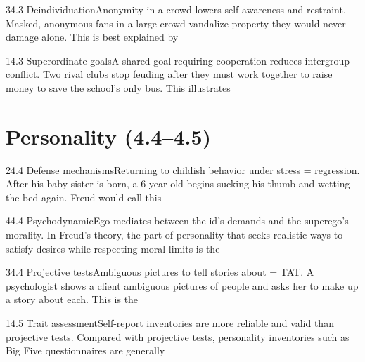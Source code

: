 \documentclass[11pt]{article}
\begin{document}
\begin{q}{3}{4.3 Deindividuation}{Anonymity in a crowd lowers self-awareness and restraint.}
Masked, anonymous fans in a large crowd vandalize property they would never damage alone. This is best explained by
\end{q}

\begin{q}{1}{4.3 Superordinate goals}{A shared goal requiring cooperation reduces intergroup conflict.}
Two rival clubs stop feuding after they must work together to raise money to save the school's only bus. This illustrates
\end{q}

\section{Personality (4.4--4.5)}

\begin{q}{2}{4.4 Defense mechanisms}{Returning to childish behavior under stress = regression.}
After his baby sister is born, a 6-year-old begins sucking his thumb and wetting the bed again. Freud would call this
\end{q}

\begin{q}{4}{4.4 Psychodynamic}{Ego mediates between the id's demands and the superego's morality.}
In Freud's theory, the part of personality that seeks realistic ways to satisfy desires while respecting moral limits is the
\end{q}

\begin{q}{3}{4.4 Projective tests}{Ambiguous pictures to tell stories about = TAT.}
A psychologist shows a client ambiguous pictures of people and asks her to make up a story about each. This is the
\end{q}

\begin{q}{1}{4.5 Trait assessment}{Self-report inventories are more reliable and valid than projective tests.}
Compared with projective tests, personality inventories such as Big Five questionnaires are generally
\end{q}
\end{document}
